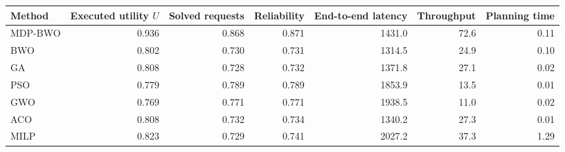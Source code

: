 \begin{tabular}{lrrrrrr}\toprule
Method & Executed utility $U$ & Solved requests & Reliability & End-to-end latency & Throughput & Planning time\\\midrule
MDP-BWO & 0.936 & 0.868 & 0.871 & 1431.0 & 72.6 & 0.11\\
BWO & 0.802 & 0.730 & 0.731 & 1314.5 & 24.9 & 0.10\\
GA & 0.808 & 0.728 & 0.732 & 1371.8 & 27.1 & 0.02\\
PSO & 0.779 & 0.789 & 0.789 & 1853.9 & 13.5 & 0.01\\
GWO & 0.769 & 0.771 & 0.771 & 1938.5 & 11.0 & 0.02\\
ACO & 0.808 & 0.732 & 0.734 & 1340.2 & 27.3 & 0.01\\
MILP & 0.823 & 0.729 & 0.741 & 2027.2 & 37.3 & 1.29\\
\bottomrule
\end{tabular}